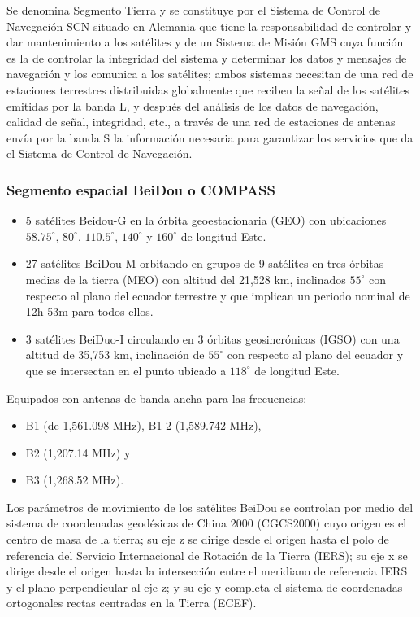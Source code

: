 Se denomina Segmento Tierra y se constituye por el Sistema de Control de Navegación SCN situado en Alemania que tiene la responsabilidad de controlar y dar mantenimiento a los satélites y de un Sistema de Misión GMS cuya función es la de controlar la integridad del sistema y determinar los datos y mensajes de navegación y los comunica a los satélites; ambos sistemas necesitan de una red de estaciones terrestres distribuidas globalmente que reciben la señal de los satélites emitidas por la banda L, y después del análisis de los datos de navegación, calidad de señal, integridad, etc., a través de una red de estaciones de antenas envía por la banda S la información necesaria para garantizar los servicios que da el Sistema de Control de Navegación.

\subsubsection{Segmento espacial BeiDou o COMPASS}
\begin{itemize}
    \item 5 satélites Beidou-G en la órbita geoestacionaria (GEO) con ubicaciones $58.75^{\circ}$, $80^{\circ}$, $110.5^{\circ}$, $140^{\circ}$ y $160^{\circ}$ de longitud Este.
    \item 27 satélites BeiDou-M orbitando en grupos de 9 satélites en tres órbitas medias de la tierra (MEO) con altitud del 21,528 km, inclinados $55^{\circ}$ con respecto al plano del ecuador terrestre y que implican un periodo nominal de 12h 53m para todos ellos.
    \item 3 satélites BeiDuo-I circulando en 3 órbitas geosincrónicas (IGSO) con una altitud de 35,753 km, inclinación de $55^{\circ}$ con respecto al plano del ecuador y que se intersectan en el punto ubicado a $118^{\circ}$ de longitud Este.
\end{itemize}

Equipados con antenas de banda ancha para las frecuencias:

\begin{itemize}
    \item B1 (de 1,561.098 MHz), B1-2 (1,589.742 MHz),
    \item B2 (1,207.14 MHz) y
    \item B3 (1,268.52 MHz).
\end{itemize}

Los parámetros de movimiento de los satélites BeiDou se controlan por medio del sistema de coordenadas geodésicas de China 2000 (CGCS2000) cuyo origen es el centro de masa de la tierra; su eje z se dirige desde el origen hasta el polo de referencia del Servicio Internacional de Rotación de la Tierra (IERS); su eje x se dirige desde el origen hasta la intersección entre el meridiano de referencia IERS y el plano perpendicular al eje z; y su eje y completa el sistema de coordenadas ortogonales rectas centradas en la Tierra (ECEF).

